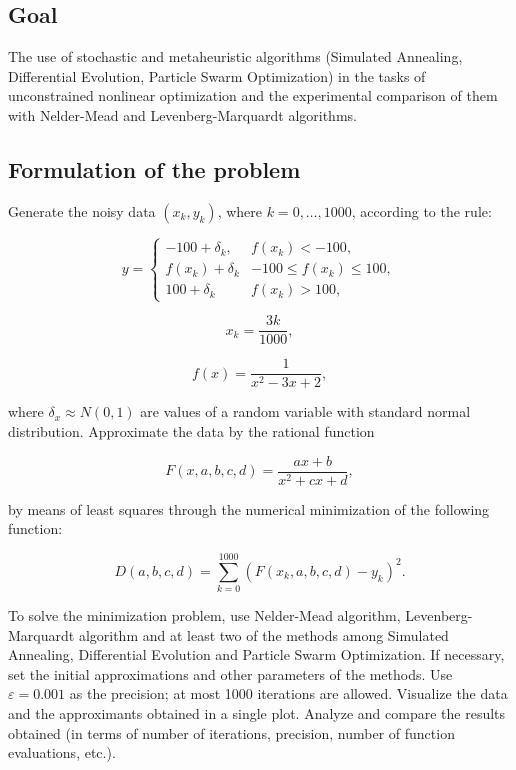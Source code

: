 \newpage
\subsection{Goal}\label{subsec:goal}

The use of stochastic and metaheuristic algorithms (Simulated Annealing, Differential Evolution, Particle Swarm Optimization) in the tasks of unconstrained nonlinear optimization and the experimental comparison of them with Nelder-Mead and Levenberg-Marquardt algorithms.

\subsection{Formulation of the problem}\label{subsec:formulation-of-the-problem}

Generate the noisy data $(x_k, y_k)$, where $k = 0, \dots, 1000$, according to the rule:

\begin{equation*}
y = \begin{cases}
-100 + \delta_k, & f(x_k) < -100, \\
f(x_k) + \delta_k & -100 \leq f(x_k) \leq 100, \\
100 + \delta_k & f(x_k) > 100,
\end{cases}
\end{equation*}

\begin{equation*}
    x_k = \frac{3k}{1000},
\end{equation*}

\begin{equation*}
    f(x) = \frac{1}{x^2 - 3x + 2},
\end{equation*}

where $\delta_x \approx N(0, 1)$ are values of a random variable with standard normal distribution.
Approximate the data by the rational function

\begin{equation*}
    F(x, a, b, c, d) = \frac{ax + b}{x^2 + cx + d},
\end{equation*}

by means of least squares through the numerical minimization of the following function:

\begin{equation*}
    D(a, b, c, d) = \sum^{1000}_{k=0}(F(x_k, a, b, c, d) - y_k)^2.
\end{equation*}

To solve the minimization problem, use Nelder-Mead algorithm, Levenberg-Marquardt algorithm and at least two of the methods among Simulated Annealing, Differential Evolution and Particle Swarm Optimization.
If necessary, set the initial approximations and other parameters of the methods.
Use $\varepsilon = 0.001$ as the precision;
at most 1000 iterations are allowed.
Visualize the data and the approximants obtained in a single plot.
Analyze and compare the results obtained (in terms of number of iterations, precision, number of function evaluations, etc.).

